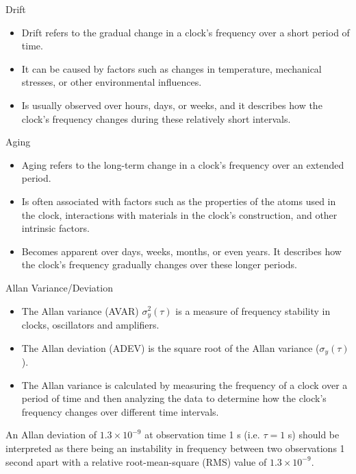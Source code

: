 \documentclass[10pt]{beamer}
\begin{document}
\begin{frame}[fragile]{Drift}
    \begin{itemize}
        \item Drift refers to the gradual change in a clock's frequency over a short period of time.
        \item It can be caused by factors such as changes in temperature, mechanical stresses, or other environmental influences.
        \item Is usually observed over hours, days, or weeks, and it describes how the clock's frequency changes during these relatively short intervals.
    \end{itemize}
\end{frame}



\begin{frame}[fragile]{Aging}
    \begin{itemize}
        \item Aging refers to the long-term change in a clock's frequency over an extended period.
        \item Is often associated with factors such as the properties of the atoms used in the clock, interactions with materials in the clock's construction, and other intrinsic factors.
        \item Becomes apparent over days, weeks, months, or even years. It describes how the clock's frequency gradually changes over these longer periods.
    \end{itemize}
\end{frame}



\begin{frame}{Allan Variance/Deviation}
    \begin{itemize}
        \item The Allan variance (AVAR) $\sigma_y^2(\tau)$ is a measure of frequency stability in clocks, oscillators and amplifiers.
        \item The Allan deviation (ADEV) is the square root of the Allan variance ($\sigma_y(\tau)$).
        \item The Allan variance is calculated by measuring the frequency of a clock over a period of time and then analyzing the data to determine how the clock's frequency changes over different time intervals.
    \end{itemize}

    An Allan deviation of $1.3 \times 10^{-9}$ at observation time 1 s (i.e. $\tau = 1$ s) should be interpreted as there being an instability in frequency between two observations 1 second apart with a relative root-mean-square (RMS) value of $1.3 \times 10^{-9}$.
\end{frame}
\end{document}
